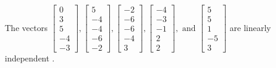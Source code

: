 \begin{exercise}
\begin{exerciseStatement}
  \end{exerciseStatement}
  \begin{exerciseAnswer}
   The vectors \(\left[\begin{array}{r}
0 \\
3 \\
5 \\
-4 \\
-3
\end{array}\right] , \left[\begin{array}{r}
5 \\
-4 \\
-4 \\
-6 \\
-2
\end{array}\right] , \left[\begin{array}{r}
-2 \\
-6 \\
-6 \\
-4 \\
3
\end{array}\right] , \left[\begin{array}{r}
-4 \\
-3 \\
-1 \\
2 \\
2
\end{array}\right] , \text{ and } \left[\begin{array}{r}
5 \\
5 \\
1 \\
-5 \\
3
\end{array}\right]\) are 
  	 linearly independent  .
  


  \end{exerciseAnswer}
\end{exercise}